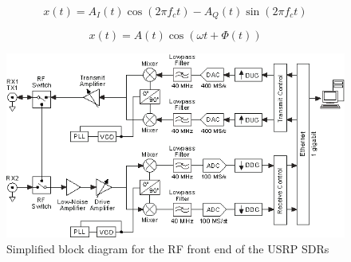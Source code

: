 \begin{equation} \label{eq:complexSampling}
    x\left(t\right) = A_{I}\left(t\right)\cos\left(2\pi f_{c}t\right) - A_{Q}\left(t\right)\sin\left(2\pi f_{c}t\right)
\end{equation}

\begin{equation} \label{eq:realSampling}
    x\left(t\right) = A\left(t\right)\cos\left(\omega t + \Phi \left(t\right)\right)
\end{equation}

\begin{figure}[h]
    \begin{centering}
        \includegraphics[width=\textwidth,keepaspectratio]{Figures/2920_simplified_system_diagram.png}
        \caption{Simplified block diagram for the RF front end of the USRP SDRs}
    \label{fig:USRPBlock}
    \end{centering}
\end{figure}